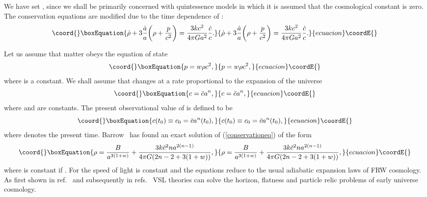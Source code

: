 \documentclass[a4paper,12pt]{article}
\begin{document}
We have set
\coordHE{}, since we shall be primarily concerned with quintessence
models in which it is assumed that the cosmological constant is zero. The
conservation equations are modified due to the time dependence of \coordHE{}:
\begin{equation}\coord{}\boxEquation{
\label{conservationeq} {\dot\rho}+3\frac{{\dot
a}}{a}\biggl(\rho+\frac{p}{c^2}\biggr) =\frac{3kc^2}{4\pi Ga^2} \frac{{\dot
c}}{c}.
}{
{\dot\rho}+3\frac{{\dot
a}}{a}\biggl(\rho+\frac{p}{c^2}\biggr) =\frac{3kc^2}{4\pi Ga^2} \frac{{\dot
c}}{c}.
}{ecuacion}\coordE{}\end{equation}

Let us assume that matter obeys the equation of state
\begin{equation}\coord{}\boxEquation{
p=w\rho c^2,
}{
p=w\rho c^2,
}{ecuacion}\coordE{}\end{equation}
where \coordHE{} is a constant. We shall assume that \coordHE{} changes at a rate
proportional to the expansion of the universe
\begin{equation}\coord{}\boxEquation{
c={\bar c}a^n,
}{
c={\bar c}a^n,
}{ecuacion}\coordE{}\end{equation}
where \coordHE{} and \coordHE{} are constants. The present observational value of
\coordHE{} is defined to be
\begin{equation}\coord{}\boxEquation{
c(t_0)\equiv c_0={\bar c}a^n(t_0),
}{
c(t_0)\equiv c_0={\bar c}a^n(t_0),
}{ecuacion}\coordE{}\end{equation}
where \coordHE{} denotes the present time.
Barrow~\cite{Barrow} has found an exact
solution of (\ref{conservationeq}) of the form
\begin{equation}\coord{}\boxEquation{
\rho=\frac{B}{a^{3(1+w)}}+\frac{3k{\bar c}^2na^{2(n-1)}} {4\pi
G(2n-2+3(1+w))},
}{
\rho=\frac{B}{a^{3(1+w)}}+\frac{3k{\bar c}^2na^{2(n-1)}} {4\pi
G(2n-2+3(1+w))},
}{ecuacion}\coordE{}\end{equation}
where \coordHE{} is constant if
\coordHE{}. For \coordHE{} the speed of light is constant and the
equations reduce to the usual adiabatic expansion laws of FRW cosmology. As
first shown in ref.~\cite{Moffat} and subsequently in
refs.~\cite{Albrecht,Barrow,Clayton} VSL theories can solve the horizon,
flatness and particle relic problems of early universe cosmology.
\end{document}

